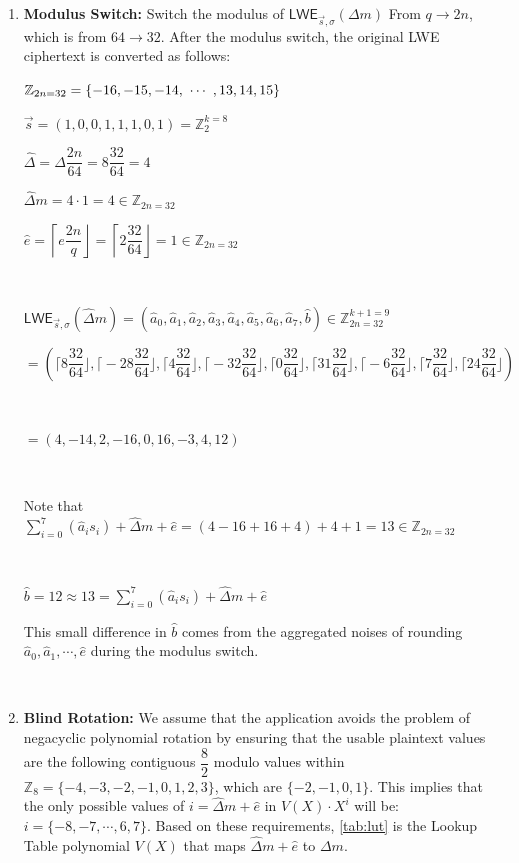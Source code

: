 \begin{enumerate}
\item \textbf{Modulus Switch:} Switch the modulus of $\textsf{LWE}_{\vec{s}, \sigma}(\Delta m)$ From $q \rightarrow 2n$, which is from $64 \rightarrow 32$. After the modulus switch, the original LWE ciphertext is converted as follows:

$\mathbb{Z}_{2n=32} = \{-16, -15, -14, \text{ } \text{$\cdots$} \text{ }, 13, 14, 15\}$

$\vec{s} = (1, 0, 0, 1, 1, 1, 0, 1) = \mathbb{Z}_2^{k=8}$


$\hat{\Delta} = \Delta\dfrac{2n}{64} = 8\dfrac{32}{64} = 4$

$\hat{\Delta}m = 4 \cdot 1 = 4 \in \mathbb{Z}_{2n=32}$

$\hat{e} =  \left\lceil e \dfrac{2n}{q} \right\rfloor = \left\lceil 2\dfrac{32}{64} \right\rfloor = 1 \in \mathbb{Z}_{2n=32}$

$ $

$\textsf{LWE}_{\vec{s}, \sigma}(\hat{\Delta}m) = (\hat{a}_0, \hat{a}_1, \hat{a}_2, \hat{a}_3, \hat{a}_4, \hat{a}_5, \hat{a}_6, \hat{a}_7, \hat{b}) \in \mathbb{Z}_{2n=32}^{k+1=9}$


$ = (\Big\lceil 8\dfrac{32}{64} \Big\rfloor, \Big\lceil -28\dfrac{32}{64}\Big\rfloor, \Big\lceil 4\dfrac{32}{64}\Big\rfloor, \Big\lceil -32\dfrac{32}{64}\Big\rfloor, \Big\lceil 0\dfrac{32}{64}\Big\rfloor, \Big\lceil 31\dfrac{32}{64}\Big\rfloor, \Big\lceil -6\dfrac{32}{64}\Big\rfloor, \Big\lceil 7\dfrac{32}{64}\Big\rfloor, \Big\lceil 24\dfrac{32}{64}\Big\rfloor)$

$ $

$= (4, {-14}, 2, -16, 0, 16, {-3}, 4, 12)$

$ $

Note that $\sum\limits_{i=0}^{7}(\hat{a}_is_i) + \hat{\Delta}m + \hat{e} = (4 - 16 + 16 + 4) + 4 + 1 = 13 \in \mathbb{Z}_{2n=32}$

$ $

$\hat b = 12 \approx 13 = \sum\limits_{i=0}^{7}(\hat{a}_is_i) + \hat{\Delta}m + \hat{e}$

This small difference in $\hat b$ comes from the aggregated noises of rounding $\hat a_0, \hat a_1, \cdots , \hat e$ during the modulus switch. 

$ $

\item \textbf{Blind Rotation:} We assume that the application avoids the problem of negacyclic polynomial rotation by ensuring that the usable plaintext values are the following contiguous $\dfrac{8}{2}$ modulo values within $\mathbb{Z}_8 = \{-4, -3, -2, -1, 0, 1, 2, 3\}$, which are $\{-2, -1, 0, 1\}$. This implies that the only possible values of $i=\hat\Delta m + \hat e$ in $V(X)\cdot X^{i}$ will be: $i = \{-8, -7, \cdots, 6, 7\}$. Based on these requirements, \autoref{tab:lut} is the Lookup Table polynomial $V(X)$ that maps $\hat{\Delta} m + \hat{e}$ to $\Delta m$. 



\end{enumerate}
